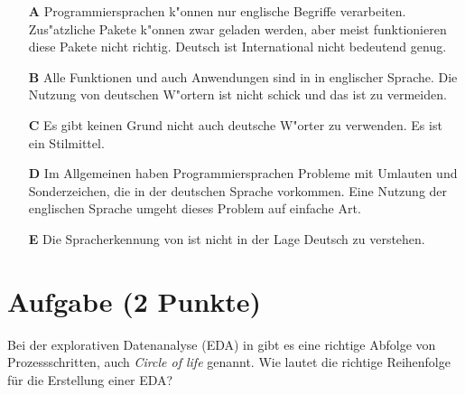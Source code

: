 \documentclass[a4paper, 10pt]{scrartcl}\usepackage[]{graphicx}\usepackage[]{xcolor}
\begin{document}
\begin{enumerate}
\item [\textbf{A} \msquare] Programmiersprachen k{"o}nnen nur englische Begriffe verarbeiten. Zus{"a}tzliche Pakete k{"o}nnen zwar geladen werden, aber meist funktionieren diese Pakete nicht richtig. Deutsch ist International nicht bedeutend genug.
\item [\textbf{B} \msquare] Alle Funktionen und auch Anwendungen sind in \Rlogo in englischer Sprache. Die Nutzung von deutschen W{"o}rtern ist nicht schick und das ist zu vermeiden.
\item [\textbf{C} \msquare] Es gibt keinen Grund nicht auch deutsche W{"o}rter zu verwenden. Es ist ein Stilmittel.
\item [\textbf{D} \msquare] Im Allgemeinen haben Programmiersprachen Probleme mit Umlauten und Sonderzeichen, die in der deutschen Sprache vorkommen. Eine Nutzung der englischen Sprache umgeht dieses Problem auf einfache Art.
\item [\textbf{E} \msquare] Die Spracherkennung von \Rlogo ist nicht in der Lage Deutsch zu verstehen.
\end{enumerate}

\section{Aufgabe \hfill (2 Punkte)}

Bei der explorativen Datenanalyse (EDA) in \Rlogo gibt es eine richtige Abfolge von Prozessschritten, auch \textit{Circle of life} genannt. Wie lautet die richtige Reihenfolge f{\"u}r die Erstellung einer EDA?
\end{document}

